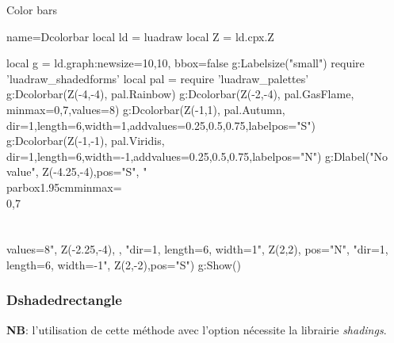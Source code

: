 \begin{demo}{Color bars}
\begin{luadraw}{name=Dcolorbar}
local ld = luadraw
local Z = ld.cpx.Z

local g = ld.graph:new{size={10,10}, bbox=false}
g:Labelsize("small")
require 'luadraw_shadedforms'
local pal = require 'luadraw_palettes'
g:Dcolorbar(Z(-4,-4), pal.Rainbow)
g:Dcolorbar(Z(-2,-4), pal.GasFlame, {minmax={0,7},values=8})
g:Dcolorbar(Z(-1,1), pal.Autumn, {dir=1,length=6,width=1,addvalues={0.25,0.5,0.75},labelpos="S"})
g:Dcolorbar(Z(-1,-1), pal.Viridis, {dir=1,length=6,width=-1,addvalues={0.25,0.5,0.75},labelpos="N"})
g:Dlabel("No value", Z(-4.25,-4),{pos="S"},
    "\\parbox{1.95cm}{minmax=\\{0,7\\}\\\\values=8}", Z(-2.25,-4), {},
    "dir=1, length=6, width=1", Z(2,2), {pos="N"},
    "dir=1, length=6, width=-1", Z(2,-2),{pos="S"})
g:Show()
\end{luadraw}
\end{demo}

\subsubsection{Dshadedrectangle}

\noindent\textbf{NB}: l'utilisation de cette méthode avec l'option  nécessite la librairie \emph{shadings}.

